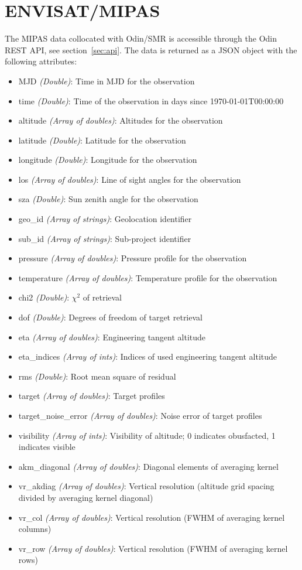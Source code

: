 \section{ENVISAT/MIPAS}
The MIPAS data collocated with Odin/SMR is accessible through the Odin REST
API, see section~\ref{sec:api}. The data is returned as a JSON object with the
following attributes:
\begin{itemize}
    \item MJD \emph{(Double)}: Time in MJD for the observation
    \item time \emph{(Double)}: Time of the observation in days since
        1970-01-01T00:00:00
    \item altitude \emph{(Array of doubles)}: Altitudes for the observation
    \item latitude \emph{(Double)}: Latitude for the observation
    \item longitude \emph{(Double)}: Longitude for the observation
    \item los \emph{(Array of doubles)}: Line of sight angles for the
        observation
    \item sza \emph{(Double)}: Sun zenith angle for the observation
    \item geo\_id \emph{(Array of strings)}: Geolocation identifier
    \item sub\_id \emph{(Array of strings)}: Sub-project identifier
    \item pressure \emph{(Array of doubles)}: Pressure profile for the
        observation
    \item temperature \emph{(Array of doubles)}: Temperature profile for the
        observation
    \item chi2 \emph{(Double)}: $\chi^2$ of retrieval
    \item dof \emph{(Double)}: Degrees of freedom of target retrieval
    \item eta \emph{(Array of doubles)}: Engineering tangent altitude
    \item eta\_indices \emph{(Array of ints)}: Indices of used engineering
        tangent altitude
    \item rms \emph{(Double)}: Root mean square of residual
    \item target \emph{(Array of doubles)}: Target profiles
    \item target\_noise\_error \emph{(Array of doubles)}: Noise error of target
        profiles
    \item visibility \emph{(Array of ints)}: Visibility of altitude;
        0 indicates obusfacted, 1 indicates visible
    \item akm\_diagonal \emph{(Array of doubles)}: Diagonal elements of
        averaging kernel
    \item vr\_akdiag \emph{(Array of doubles)}: Vertical resolution (altitude
        grid spacing divided by averaging kernel diagonal)
    \item vr\_col \emph{(Array of doubles)}: Vertical resolution (FWHM of
        averaging kernel columns)
    \item vr\_row \emph{(Array of doubles)}: Vertical resolution (FWHM of
        averaging kernel rows)
\end{itemize}

